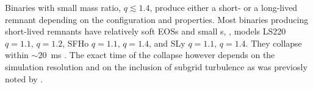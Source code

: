 Binaries with small mass ratio, $q\lesssim1.4$,
produce either a short- or a long-lived remnant depending  
on the \pmerg{} configuration and properties. 
%
Most binaries producing short-lived remnants have relatively soft \acp{EOS}
and small \mr{}s, \eg, models LS220 $q=1.1, \,q=1.2$, SFHo $q=1.1, \,q=1.4$, 
and SLy $q=1.1,\, q=1.4$. They collapse within ${\sim}20$~ms \pmerg. 
The exact time of the collapse however depends on the simulation resolution 
and on the inclusion of subgrid turbulence as was previosly noted by \citet{Radice:2017zta}.







